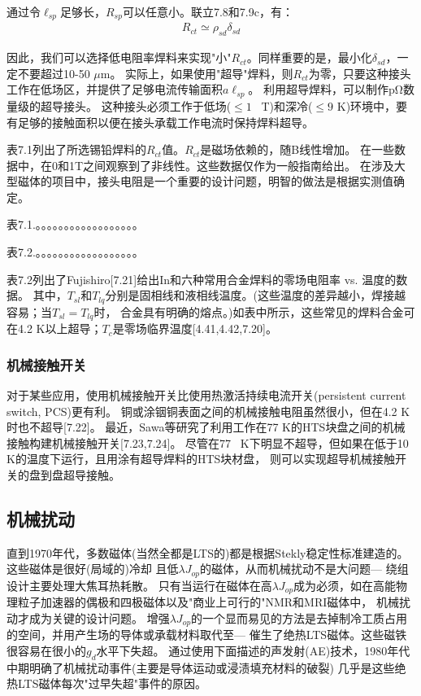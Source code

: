 通过令$\ell_{sp}$足够长，$R_{sp}$可以任意小。联立7.8和7.9c，有：
\begin{align}%
R_{ct}\simeq\rho_{sd}\delta_{sd}
\end{align}

因此，我们可以选择低电阻率焊料来实现"小"$R_{ct}$。同样重要的是，最小化$\delta_{sd}$，一定不要超过10-50 $\mu$m。
实际上，如果使用"超导"焊料，则$R_{ct}$为零，只要这种接头工作在低场区，并提供了足够电流传输面积$a\ell_{sp}$。
利用超导焊料，可以制作$\mathrm{p\Omega}$数量级的超导接头。
这种接头必须工作于低场($\le 1$~ T)和深冷($\le 9$ K)环境中，要有足够的接触面积以便在接头承载工作电流时保持焊料超导。

表7.1列出了所选锡铅焊料的$R_{ct}$值。$R_{ct}$是磁场依赖的，随B线性增加。
在一些数据中，在0和1T之间观察到了非线性。这些数据仅作为一般指南给出。
在涉及大型磁体的项目中，接头电阻是一个重要的设计问题，明智的做法是根据实测值确定。


表7.1.。。。。。。。。。。。。。。。。。。

表7.2.。。。。。。。。。。。。。。。。。。

表7.2列出了Fujishiro[7.21]给出In和六种常用合金焊料的零场电阻率 vs. 温度的数据。
其中，$T_{sl}$和$T_{lq}$分别是固相线和液相线温度。(这些温度的差异越小，焊接越容易；当$T_{sl} = T_{lq}$时，
合金具有明确的熔点。)如表中所示，这些常见的焊料合金可在4.2 K以上超导；$T_c$是零场临界温度[4.41,4.42,7.20]。

\subsubsection*{机械接触开关}
对于某些应用，使用机械接触开关比使用热激活持续电流开关(persistent current switch, PCS)更有利。
铜或涂铟铜表面之间的机械接触电阻虽然很小，但在4.2 K时也不超导[7.22]。
最近，Sawa等研究了利用工作在77 K的HTS块盘之间的机械接触构建机械接触开关[7.23,7.24]。
尽管在77~ K下明显不超导，但如果在低于10 K的温度下运行，且用涂有超导焊料的HTS块材盘，
则可以实现超导机械接触开关的盘到盘超导接触。

\subsection{机械扰动}
直到1970年代，多数磁体(当然全都是LTS的)都是根据Stekly稳定性标准建造的。这些磁体是很好(局域的)冷却
且低$\lambda J_{op}$的磁体，从而机械扰动不是大问题---
绕组设计主要处理大焦耳热耗散。
只有当运行在磁体在高$\lambda J_{op}$成为必须，如在高能物理粒子加速器的偶极和四极磁体以及"商业上可行的"NMR和MRI磁体中，
机械扰动才成为关键的设计问题。
增强$\lambda J_{op}$的一个显而易见的方法是去掉制冷工质占用的空间，并用产生场的导体或承载材料取代至---
催生了绝热LTS磁体。这些磁铁很容易在很小的$g_d$水平下失超。
通过使用下面描述的声发射(AE)技术，1980年代中期明确了机械扰动事件(主要是导体运动或浸渍填充材料的破裂)
几乎是这些绝热LTS磁体每次"过早失超"事件的原因。


